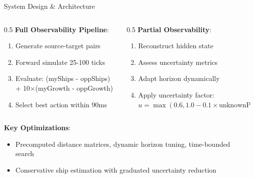 \documentclass{beamer}
\begin{document}
\begin{frame}{System Design \& Architecture}
  \begin{columns}
  \begin{column}{0.5\textwidth}
    \textbf{Full Observability Pipeline}:
    \begin{enumerate}
      \item Generate source-target pairs
      \item Forward simulate 25-100 ticks
      \item Evaluate: (myShips - oppShips) + 10×(myGrowth - oppGrowth)
      \item Select best action within 90ms
    \end{enumerate}
  \end{column}
  \begin{column}{0.5\textwidth}
    \textbf{Partial Observability}:
    \begin{enumerate}
      \item Reconstruct hidden state
      \item Assess uncertainty metrics
      \item Adapt horizon dynamically
      \item Apply uncertainty factor: $u = \max(0.6, 1.0 - 0.1 \times \text{unknownPlanets})$
    \end{enumerate}
  \end{column}
  \end{columns}
  
  \vspace{0.5cm}
  \textbf{Key Optimizations}:
  \begin{itemize}
    \item Precomputed distance matrices, dynamic horizon tuning, time-bounded search
    \item Conservative ship estimation with graduated uncertainty reduction
  \end{itemize}
\end{frame}
\end{document}
